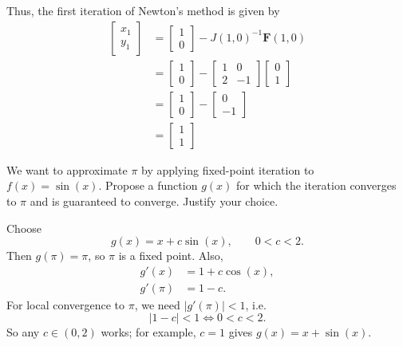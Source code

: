 \documentclass[reqno, answers]{exam}
\begin{document}
\begin{questions}
\begin{solution}
    Thus, the first iteration of Newton's method is given by
    \begin{align*}
      \begin{bmatrix} x_1 \\ y_1 \end{bmatrix} & = \begin{bmatrix} 1 \\ 0 \end{bmatrix} - J(1, 0)^{-1} \mathbf{F}(1, 0)                                                      \\
                                               & = \begin{bmatrix} 1 \\ 0 \end{bmatrix} - \begin{bmatrix} 1 & 0 \\ 2 & -1 \end{bmatrix} \begin{bmatrix} 0 \\ 1 \end{bmatrix} \\
                                               & = \begin{bmatrix} 1 \\ 0 \end{bmatrix} - \begin{bmatrix} 0 \\ -1 \end{bmatrix}                                              \\
                                               & = \begin{bmatrix} 1 \\ 1 \end{bmatrix}
    \end{align*}
  \end{solution}




  \newpage

  \question[5] We want to approximate $\pi$ by applying fixed-point iteration to $f(x)=\sin(x)$. Propose a function $g(x)$ for which the iteration converges to $\pi$ and is guaranteed to converge. Justify your choice.

  \begin{solution}
    Choose
    \[
      g(x)=x+c\sin(x),\qquad 0<c<2.
    \]
    Then $g(\pi)=\pi$, so $\pi$ is a fixed point. Also,
    \begin{align*}
      g'(x)   & = 1+c\cos(x), \\
      g'(\pi) & = 1-c.
    \end{align*}
    For local convergence to $\pi$, we need $|g'(\pi)|<1$, i.e.
    \[
      |1-c|<1 \iff 0<c<2.
    \]
    So any $c\in(0,2)$ works; for example, $c=1$ gives $g(x)=x+\sin(x)$.
  \end{solution}
  \vfill


\end{questions}
\end{document}
